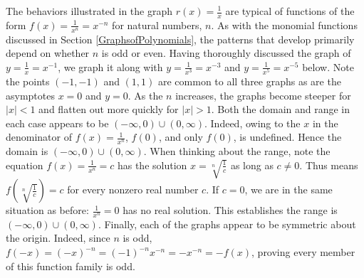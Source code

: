 \documentclass{ximera}
\begin{document}
The behaviors illustrated in the graph $r(x) = \frac{1}{x}$ are typical of functions of the form $f(x) = \frac{1}{x^n} = x^{-n}$ for natural numbers, $n$.  As with the monomial functions discussed in Section \ref{GraphsofPolynomials}, the patterns that develop primarily depend on whether $n$ is odd or even.  Having thoroughly discussed the graph of $y = \frac{1}{x} = x^{-1}$, we graph it along with $y = \frac{1}{x^3} = x^{-3}$ and $y = \frac{1}{x^5} = x^{-5}$ below.  Note the points $(-1,-1)$ and $(1,1)$ are common to all three graphs as are the asymptotes $x = 0$ and $y = 0$.  As the $n$ increases, the graphs become steeper for $|x| < 1$  and flatten out more quickly for $|x|>1$.  Both the domain and range in each case appears to be $(-\infty, 0) \cup (0, \infty)$.  Indeed, owing to the $x$ in the denominator of $f(x) = \frac{1}{x^n}$, $f(0)$, and only $f(0)$,  is undefined. Hence the domain is $(-\infty, 0) \cup (0, \infty)$.  When thinking about the range, note the equation  $f(x)= \frac{1}{x^n}  = c$ has the solution $x = \sqrt[n]{\frac{1}{c}}$ as long as $c \neq 0$.  Thus means $f\left( \sqrt[n]{\frac{1}{c}} \right) = c$ for every nonzero real number $c$.  If $c = 0$, we are in the same situation as before:  $\frac{1}{x^n} = 0$ has no real solution.  This establishes the range is $(-\infty, 0) \cup (0, \infty)$.  Finally, each of the graphs appear to be symmetric about the origin.  Indeed, since $n$ is odd, $f(-x) = (-x)^{-n} = (-1)^{-n} x^{-n} = -x^{-n} = -f(x)$, proving every member of this function family is odd.  
\end{document}
